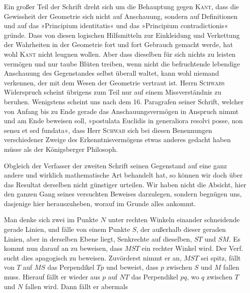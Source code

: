 Ein großer Teil der Schrift dreht sich um die Behauptung gegen \textsc{Kant}, dass die
Gewissheit der Geometrie sich nicht auf Anschauung, sondern auf Definitionen und auf das
»Principium identitatis« und das »Principium contradictionis« gründe. Dass von diesen
logischen Hilfsmitteln zur Einkleidung und Verkettung der Wahrheiten in der Geometrie fort
und fort Gebrauch gemacht werde, hat wohl \textsc{Kant} nicht leugnen wollen. Aber dass
dieselben für sich nichts zu leisten vermögen und nur taube Blüten treiben, wenn nicht die
befruchtende lebendige Anschauung des Gegenstandes selbst überall waltet, kann wohl niemand
verkennen, der mit dem Wesen der Geometrie vertraut ist. Herrn \textsc{Schwabs} Widerspruch
scheint übrigens zum Teil nur auf einem Missverständnis zu beruhen. Wenigstens scheint uns nach
dem 16. Paragrafen seiner Schrift, welcher von Anfang bis zu Ende gerade das
Anschauungsvermögen in Anspruch nimmt und am Ende beweisen soll, »postulata Euclidis in
generaliora resolvi posse, non sensu et  sed  fundata«, dass Herr
\textsc{Schwab} sich bei diesen Benennungen verschiedener Zweige des Erkenntnisvermögens
etwas anderes gedacht haben müsse als der Königsberger Philosoph.

Obgleich der Verfasser der zweiten Schrift seinen Gegenstand auf eine ganz andere und
wirklich mathematische Art behandelt hat, so können wir doch über das Resultat derselben
nicht günstiger urteilen. Wir haben nicht die Absicht, hier den ganzen Gang seines
versuchten Beweises darzulegen, sondern begnügen uns, dasjenige hier herauszuheben, worauf
im Grunde alles ankommt.

\begin{center}\end{center}

Man denke sich zwei im Punkte $N$ unter rechten Winkeln einander schneidende gerade Linien,
und fälle von einem Punkte $S$, der außerhalb dieser geraden Linien, aber in derselben
Ebene liegt, Senkrechte auf dieselben, $ST$ und $SM$. Es kommt nun darauf an zu beweisen,
dass $MST$ ein rechter Winkel wird. Der Verf. sucht dies apagogisch zu beweisen.
Zuvörderst nimmt er an, $MST$ sei spitz, fällt von $T$ auf $MS$ das Perpendikel $Tp$ und
beweist, dass $p$ zwischen $S$ und $M$ fallen muss. Hierauf fällt er wieder aus $p$ auf $NT$ das Perpendikel $pq$, wo $q$ zwischen $T$ und $N$ fallen wird. Dann fällt er abermals
